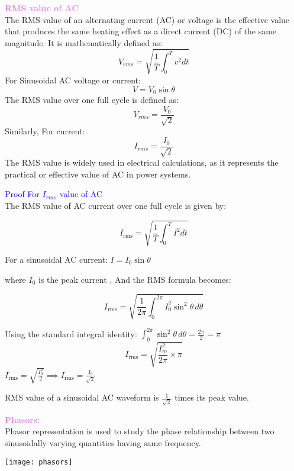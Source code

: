 \documentclass{beamer}
\begin{document}
\begin{frame}
\textcolor{violet}{\textbf{RMS value of AC}}\\
The RMS value of an alternating current (AC) or voltage is the effective value that produces the same heating effect as a direct current (DC) of the same magnitude. It is mathematically defined as:
\[
V_{rms}=\sqrt{\frac{1}{T}\int_{0}^{T}v^2dt}
\]
For Sinusoidal AC voltage or current:
\[
V=V_0\sin\theta
\]
The RMS value over one full cycle is defined as:
\[
V_{rms}=\frac{V_0}{\sqrt{2}}
\]
Similarly, For current: 
\[
 I_{rms}=\frac{I_0}{\sqrt{2}}
 \]
 The RMS value is widely used in electrical calculations, as it represents the practical or effective value of AC in power systems.
\end{frame}


\begin{frame}
\textcolor{blue}{Proof For $I_{rms}$ value of AC}\\
The RMS value of AC current over one full cycle is given by:

\[
I_{\text{rms}} = \sqrt{\frac{1}{T} \int_0^T I^2 dt}
\]

For a sinusoidal AC current: $I = I_0 \sin\theta$

where \( I_0 \) is the peak current , And the RMS formula becomes:

\[
I_{\text{rms}} = \sqrt{\frac{1}{2\pi} \int_0^{2\pi} I_0^2 \sin^2\theta \, d\theta}
\]

Using the standard integral identity: $\int_0^{2\pi} \sin^2\theta \, d\theta = \frac{2\pi}{2} = \pi$\\

\[
I_{\text{rms}} = \sqrt{\frac{I_m^2}{2\pi} \times \pi}
\]
$I_{\text{rms}} = \sqrt{\frac{I_0^2}{2}} \implies I_{\text{rms}} = \frac{I_0}{\sqrt{2}} $ 



RMS value of a sinusoidal AC waveform is \(\frac{1}{\sqrt{2}}\) times its peak value.

\end{frame}

\begin{frame}
\textcolor{violet}{\textbf{Phasors:}}\\
 Phasor representation is used to study the phase relationship between two sinusoidally varying quantities having same frequency.
\begin{center}
\texttt{[image: phasors]}
\end{center}
\end{frame}
\end{document}

